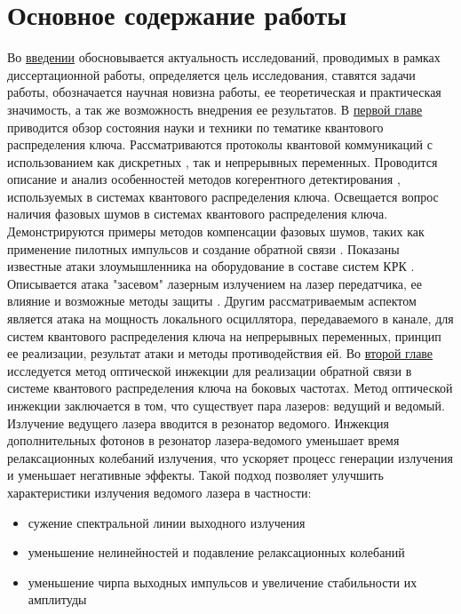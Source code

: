 \section*{Основное содержание работы }
Во \underline{введении} обосновывается актуальность исследований, проводимых в рамках диссертационной работы, определяется цель исследования, ставятся задачи работы, обозначается научная новизна работы, ее теоретическая и практическая значимость, а так же возможность внедрения ее результатов. 
\newline В \underline{первой главе} приводится обзор состояния науки и техники по тематике квантового распределения ключа. Рассматриваются протоколы квантовой коммуникаций с использованием как дискретных \cite{bennett1984,bennett1992,ekert1991,wang2005b}, так и непрерывных переменных\cite{yuan2005,andersen2010,dixon2010,hajomer2024,diamanti2015}. Проводится описание и анализ особенностей методов когерентного детектирования \cite{ip2008a}, используемых в системах квантового распределения ключа. Освещается вопрос наличия фазовых шумов в системах квантового распределения ключа. Демонстрируются примеры методов компенсации фазовых шумов, таких как применение пилотных импульсов \cite{wang2020} и создание обратной связи \cite{khaksar2023a}.  Показаны известные атаки злоумышленника на оборудование в составе систем КРК \cite{lydersen2010a,gisin2006, huang2013}. Описывается атака "засевом" лазерным излучением на лазер передатчика, ее влияние и возможные методы защиты \cite{huang2019,lovic2023,ma2013}. Другим рассматриваемым аспектом является атака на мощность локального осциллятора, передаваемого в канале, для систем квантового распределения ключа на непрерывных переменных, принцип ее реализации, результат атаки и методы противодействия ей\cite{jouguet2013, shao2022, fan2023, ren2019}.
\newline Во \underline{второй главе} исследуется метод оптической инжекции \cite{shakhovoy2024,liu2020} для реализации обратной связи в системе квантового распределения ключа на боковых частотах\cite{gleim2016,gleim2017,fadeev2024}. Метод оптической инжекции заключается в том, что существует пара лазеров: ведущий и ведомый. Излучение ведущего лазера вводится в резонатор ведомого. Инжекция дополнительных фотонов в резонатор лазера-ведомого уменьшает время релаксационных колебаний излучения, что ускоряет процесс генерации излучения и уменьшает негативные эффекты. Такой подход позволяет улучшить характеристики излучения ведомого лазера в частности:
\begin{itemize}
    \item сужение спектральной линии выходного излучения
    \item уменьшение нелинейностей и подавление релаксационных колебаний
    \item уменьшение чирпа выходных импульсов и увеличение стабильности их амплитуды
\end{itemize}
